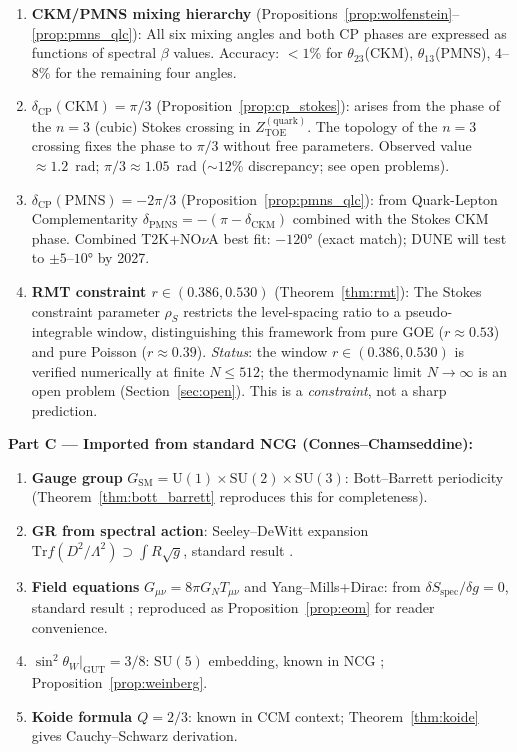 \documentclass[12pt]{article}
\theoremstyle{definition}
\theoremstyle{remark}
\newcommand{\SU}{\mathrm{SU}}
\newcommand{\Tr}{\mathrm{Tr}}
\newcommand{\TOE}{\mathrm{TOE}}
\begin{document}
\begin{enumerate}
\item \textbf{CKM/PMNS mixing hierarchy}
  (Propositions~\ref{prop:wolfenstein}--\ref{prop:pmns_qlc}):
  All six mixing angles and both CP phases are expressed as functions of
  spectral $\beta$ values.  Accuracy: $<1\%$ for $\theta_{23}$(CKM),
  $\theta_{13}$(PMNS), $4$--$8\%$ for the remaining four angles.
\item \textbf{$\delta_\mathrm{CP}(\mathrm{CKM}) = \pi/3$}
  (Proposition~\ref{prop:cp_stokes}): arises from the phase of the $n=3$
  (cubic) Stokes crossing in $Z_\TOE^{(\mathrm{quark})}$.
  The topology of the $n=3$ crossing fixes the phase to $\pi/3$ without
  free parameters.  Observed value $\approx 1.2$~rad; $\pi/3 \approx 1.05$~rad
  ($\sim 12\%$ discrepancy; see open problems).
\item \textbf{$\delta_\mathrm{CP}(\mathrm{PMNS}) = -2\pi/3$}
  (Proposition~\ref{prop:pmns_qlc}): from Quark-Lepton Complementarity
  $\delta_\mathrm{PMNS} = -(\pi - \delta_\mathrm{CKM})$ combined with the
  Stokes CKM phase.  Combined T2K+NO$\nu$A best fit: $-120°$ (exact match);
  DUNE will test to $\pm 5$--$10°$ by 2027.
\item \textbf{RMT constraint $r \in (0.386, 0.530)$}
  (Theorem~\ref{thm:rmt}): The Stokes constraint parameter $\rho_S$
  restricts the level-spacing ratio to a pseudo-integrable window,
  distinguishing this framework from pure GOE ($r \approx 0.53$) and pure
  Poisson ($r \approx 0.39$).
  \emph{Status}: the window $r \in (0.386, 0.530)$ is verified numerically at
  finite $N \leq 512$; the thermodynamic limit $N\to\infty$ is an open problem
  (Section~\ref{sec:open}).  This is a \emph{constraint}, not a sharp prediction.
\end{enumerate}

\medskip
\noindent
\textbf{Part C — Imported from standard NCG (Connes--Chamseddine):}
\begin{enumerate}
\item \textbf{Gauge group} $G_\mathrm{SM} = \mathrm{U}(1)\times\SU(2)\times\SU(3)$:
  Bott--Barrett periodicity \cite{Barrett2007,ConnesMarcolli2008}
  (Theorem~\ref{thm:bott_barrett} reproduces this for completeness).
\item \textbf{GR from spectral action}: Seeley--DeWitt expansion
  $\Tr f(D^2/\Lambda^2) \supset \int R\sqrt{g}$,
  standard result \cite{ConnesChamseddine1997}.
\item \textbf{Field equations} $G_{\mu\nu} = 8\pi G_N T_{\mu\nu}$ and
  Yang--Mills+Dirac: from $\delta S_\mathrm{spec}/\delta g = 0$,
  standard result \cite{ChamseddineConnes2007}; reproduced as
  Proposition~\ref{prop:eom} for reader convenience.
\item \textbf{$\sin^2\theta_W|_\mathrm{GUT} = 3/8$}: $\SU(5)$ embedding,
  known in NCG \cite{ConnesMarcolli2008}; Proposition~\ref{prop:weinberg}.
\item \textbf{Koide formula $Q = 2/3$}: known in CCM context;
  Theorem~\ref{thm:koide} gives Cauchy--Schwarz derivation.
\end{enumerate}
\end{document}
